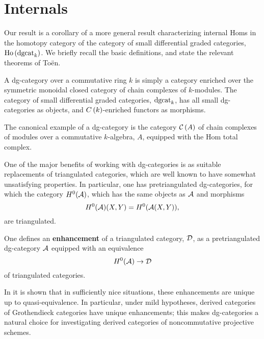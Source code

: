 \documentclass[reqno, 12pt]{amsart}
\begin{document}
\section{Internals}

Our result is a corollary of a more general result characterizing internal Homs in the homotopy category of the category of small differential graded categories,
$\operatorname{Ho}\left(\operatorname{dgcat}_k\right)$.
We briefly recall the basic definitions, and state the relevant theorems of To\"en.

A dg-category over a commutative ring $k$ is simply a category enriched over the symmetric monoidal closed category of chain complexes of $k$-modules.
The category of small differential graded categories, $\operatorname{dgcat}_k$, has all small dg-categories as objects, and $C\left(k\right)$-enriched functors as morphisms.

\begin{example}
  The canonical example of a dg-category is the category $\mathcal{C}\left(A\right)$ of chain complexes of modules over a commutative $k$-algebra, $A$, equipped with the Hom total complex.
\end{example}

One of the major benefits of working with dg-categories is as suitable replacements of triangulated categories, which are well known to have somewhat unsatisfying properties.
In particular, one has pretriangulated dg-categories, for which the category $H^0(\mathcal{A})$, which has the same objects as $\mathcal{A}$ and morphisms
$$H^0(\mathcal{A})(X,Y) = H^0(\mathcal{A}(X,Y)),$$
are triangulated.
\begin{definition}
  One defines an \textbf{enhancement} of a triangulated category, $\mathcal{D}$, as a pretriangulated dg-category $\mathcal{A}$ equipped with an equivalence
  $$H^0(\mathcal{A}) \to \mathcal{D}$$
  of triangulated categories.
\end{definition}
In \cite{Lunts Orlov} it is shown that in sufficiently nice situations, these enhancements are unique up to quasi-equivalence.
In particular, under mild hypotheses, derived categories of Grothendieck categories have unique enhancements; this makes dg-categories a natural choice for investigating derived categories of noncommutative projective schemes.
\end{document}
